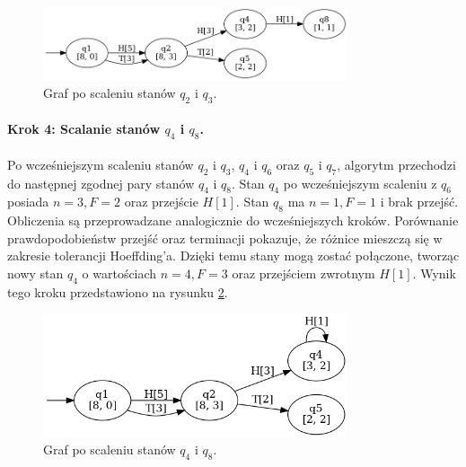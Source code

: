 \begin{figure}[ht]
    \centering
    \includegraphics[width=0.8\textwidth]{images/run_example/alergia/1.png}
    \caption{Graf po scaleniu stanów \( q_2 \) i \( q_3 \).}
    \label{fig:alergia_example_1}
\end{figure}

\paragraph*{Krok 4: Scalanie stanów \( q_4 \) i \( q_8 \).}  
Po wcześniejszym scaleniu stanów \( q_2 \) i \( q_3 \), \( q_4 \) i \( q_6 \) oraz \( q_5 \) i \( q_7 \), algorytm przechodzi do następnej zgodnej pary stanów \( q_4 \) i \( q_8 \). Stan \( q_4 \) po wcześniejszym scaleniu z \( q_6 \) posiada \( n = 3, F = 2 \) oraz przejście \( H[1] \). Stan \( q_8 \) ma \( n = 1, F = 1 \) i brak przejść. Obliczenia są przeprowadzane analogicznie do wcześniejszych kroków. Porównanie prawdopodobieństw przejść oraz terminacji pokazuje, że różnice mieszczą się w zakresie tolerancji Hoeffding’a. Dzięki temu stany mogą zostać połączone, tworząc nowy stan \( q_4 \) o wartościach \( n = 4, F = 3 \) oraz przejściem zwrotnym \( H[1] \). Wynik tego kroku przedstawiono na rysunku \ref{fig:alergia_example_2}.  

\begin{figure}[ht]
    \centering
    \includegraphics[width=0.8\textwidth]{images/run_example/alergia/2.png}
    \caption{Graf po scaleniu stanów \( q_4 \) i \( q_8 \).}
    \label{fig:alergia_example_2}
\end{figure}  

